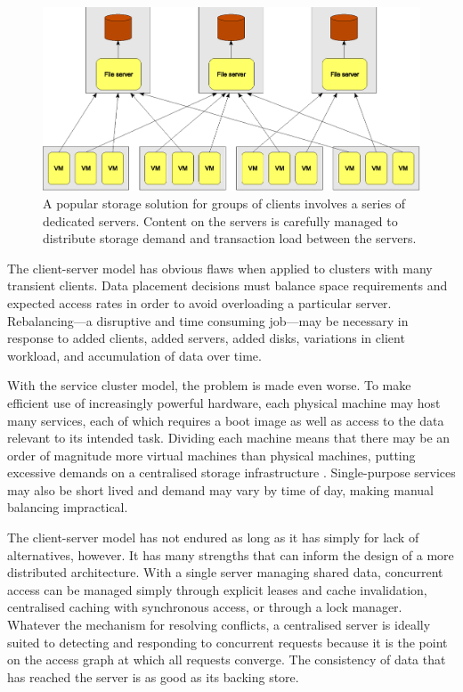 \begin{figure}[t]
\centering
\includegraphics[width=\figwidth]{figures/client-server}
\caption[Machines served by a series of client-server file systems]{A popular storage solution for groups of clients involves a series of dedicated servers. Content on the servers is carefully managed to distribute storage demand and transaction load between the servers.}
\label{fig:client-server}
\end{figure}

The client-server model has obvious flaws when applied to clusters with many transient clients. Data placement decisions must balance space requirements and expected access rates in order to avoid overloading a particular server. Rebalancing---a disruptive and time consuming job---may be necessary in response to added clients, added servers, added disks, variations in client workload, and accumulation of data over time.

With the service cluster model, the problem is made even worse. To make efficient use of increasingly powerful hardware, each physical machine may host many services, each of which requires a boot image as well as access to the data relevant to its intended task. Dividing each machine means that there may be an order of magnitude more virtual machines than physical machines, putting excessive demands on a centralised storage infrastructure \cite{hospodor}. Single-purpose services may also be short lived and demand may vary by time of day, making manual balancing impractical.

The client-server model has not endured as long as it has simply for lack of alternatives, however. It has many strengths that can inform the design of a more distributed architecture. With a single server managing shared data, concurrent access can be managed simply through explicit leases and cache invalidation, centralised caching with synchronous access, or through a lock manager. Whatever the mechanism for resolving conflicts, a centralised server is ideally suited to detecting and responding to concurrent requests because it is the point on the access graph at which all requests converge. The consistency of data that has reached the server is as good as its backing store.

